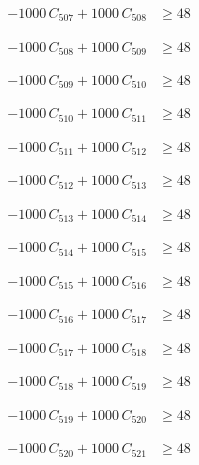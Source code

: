 \documentclass[a4paper,11pt]{article}
\begin{document}
\begin{align}
-1000\,C_{507} + 1000\,C_{508} &\geq 48 \nonumber
\end{align}

\begin{align}
-1000\,C_{508} + 1000\,C_{509} &\geq 48 \nonumber
\end{align}

\begin{align}
-1000\,C_{509} + 1000\,C_{510} &\geq 48 \nonumber
\end{align}

\begin{align}
-1000\,C_{510} + 1000\,C_{511} &\geq 48 \nonumber
\end{align}

\begin{align}
-1000\,C_{511} + 1000\,C_{512} &\geq 48 \nonumber
\end{align}

\begin{align}
-1000\,C_{512} + 1000\,C_{513} &\geq 48 \nonumber
\end{align}

\begin{align}
-1000\,C_{513} + 1000\,C_{514} &\geq 48 \nonumber
\end{align}

\begin{align}
-1000\,C_{514} + 1000\,C_{515} &\geq 48 \nonumber
\end{align}

\begin{align}
-1000\,C_{515} + 1000\,C_{516} &\geq 48 \nonumber
\end{align}

\begin{align}
-1000\,C_{516} + 1000\,C_{517} &\geq 48 \nonumber
\end{align}

\begin{align}
-1000\,C_{517} + 1000\,C_{518} &\geq 48 \nonumber
\end{align}

\begin{align}
-1000\,C_{518} + 1000\,C_{519} &\geq 48 \nonumber
\end{align}

\begin{align}
-1000\,C_{519} + 1000\,C_{520} &\geq 48 \nonumber
\end{align}

\begin{align}
-1000\,C_{520} + 1000\,C_{521} &\geq 48 \nonumber
\end{align}
\end{document}

